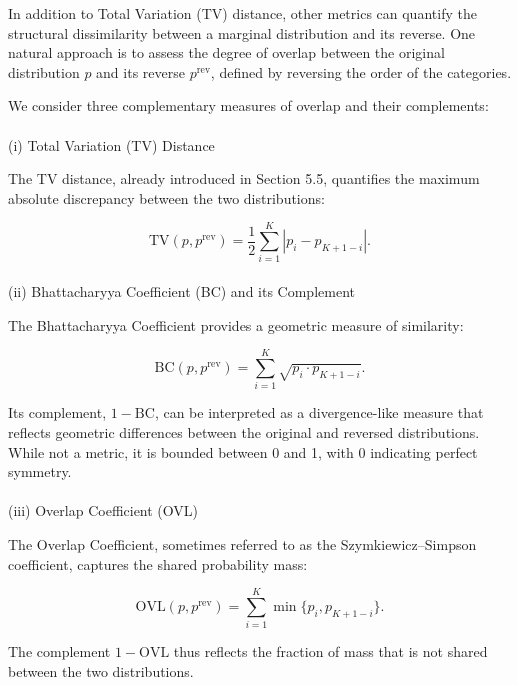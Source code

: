 \documentclass[
  12pt,
]{article}
\makeatletter
\let\oldparagraph\paragraph
\renewcommand{\paragraph}{
    \@ifstar
      \xxxParagraphStar
      \xxxParagraphNoStar
  }
\newcommand{\xxxParagraphStar}[1]{\oldparagraph*{#1}\mbox{}}
\newcommand{\xxxParagraphNoStar}[1]{\oldparagraph{#1}\mbox{}}
\theoremstyle{plain}
\theoremstyle{definition}
\theoremstyle{remark}
\makeatother
\begin{document}
In addition to Total Variation (TV) distance, other metrics can quantify
the structural dissimilarity between a marginal distribution and its
reverse. One natural approach is to assess the degree of overlap between
the original distribution \(p\) and its reverse \(p^{\mathrm{rev}}\),
defined by reversing the order of the categories.

We consider three complementary measures of overlap and their
complements:

\paragraph{(i) Total Variation (TV)
Distance}\label{i-total-variation-tv-distance}

The TV distance, already introduced in Section 5.5, quantifies the
maximum absolute discrepancy between the two distributions:

\[
\text{TV}(p, p^{\mathrm{rev}}) = \frac{1}{2} \sum_{i=1}^{K} \left| p_i - p_{K+1 - i} \right|.
\]

\paragraph{(ii) Bhattacharyya Coefficient (BC) and its
Complement}\label{ii-bhattacharyya-coefficient-bc-and-its-complement}

The Bhattacharyya Coefficient provides a geometric measure of
similarity:

\[
\text{BC}(p, p^{\mathrm{rev}}) = \sum_{i=1}^{K} \sqrt{ p_i \cdot p_{K+1 - i} }.
\]

Its complement, \(1 - \text{BC}\), can be interpreted as a
divergence-like measure that reflects geometric differences between the
original and reversed distributions. While not a metric, it is bounded
between 0 and 1, with 0 indicating perfect symmetry.

\paragraph{(iii) Overlap Coefficient
(OVL)}\label{iii-overlap-coefficient-ovl}

The Overlap Coefficient, sometimes referred to as the
Szymkiewicz--Simpson coefficient, captures the shared probability mass:

\[
\text{OVL}(p, p^{\mathrm{rev}}) = \sum_{i=1}^{K} \min\{ p_i, p_{K+1 - i} \}.
\]

The complement \(1 - \text{OVL}\) thus reflects the fraction of mass
that is not shared between the two distributions.
\end{document}
